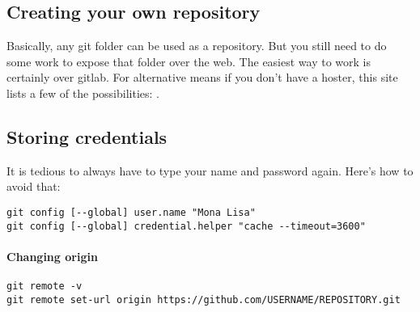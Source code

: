 \subsection{Creating your own repository}
Basically, any git folder can be used as a repository. But you still need to do some work to expose that folder over the web. The easiest way to work is certainly over gitlab. For alternative means if you don't have a hoster, this site lists a few of the possibilities: .



\subsection{Storing credentials}
It is tedious to always have to type your name and password again. Here's how to avoid that: 
\begin{lstlisting}
git config [--global] user.name "Mona Lisa"
git config [--global] credential.helper "cache --timeout=3600"
\end{lstlisting}

\paragraph{Changing origin}
\begin{lstlisting}
git remote -v
git remote set-url origin https://github.com/USERNAME/REPOSITORY.git
\end{lstlisting}